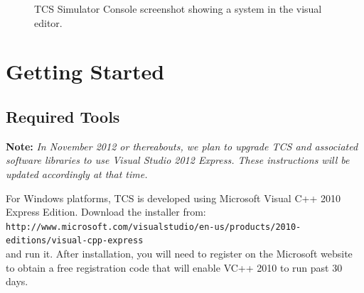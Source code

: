 \documentclass{article}
\begin{document}
\begin{figure}[hp]
\begin{center}\end{center}
\caption{TCS Simulator Console screenshot showing a system in the visual editor.}
\label{fig_tcsconsole}
\end{figure}


\section{Getting Started}
\subsection{Required Tools}

\textbf{Note:} \emph{In November 2012 or thereabouts, we plan to upgrade TCS and associated software libraries to use Visual Studio 2012 Express.  These instructions will be updated accordingly at that time.}
\vspace{0.25in}

For Windows platforms, TCS is developed using Microsoft Visual C++ 2010 Express Edition.  Download the installer from:\\
\texttt{http://www.microsoft.com/visualstudio/en-us/products/2010-editions/visual-cpp-express}\\ and run it.  After installation, you will need to register on the Microsoft website to obtain a free registration code that will enable VC++ 2010 to run past 30 days.
\end{document}
